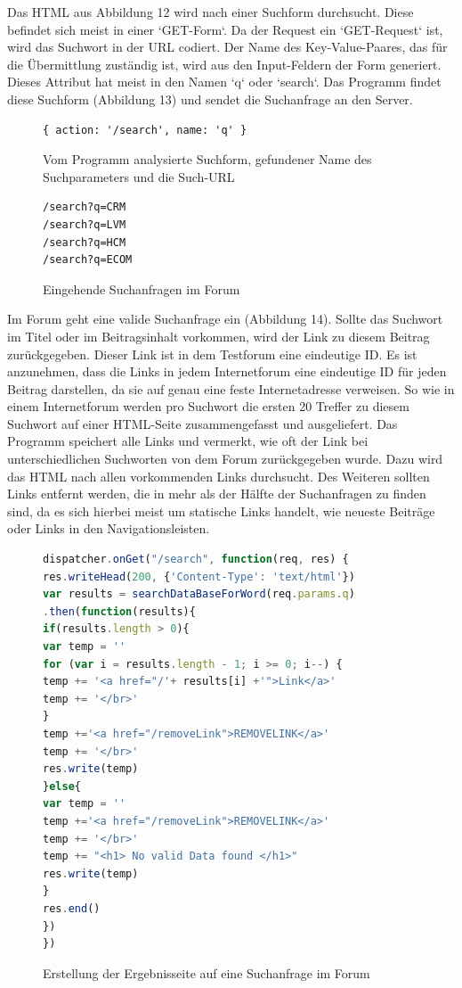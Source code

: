 Das HTML aus Abbildung 12 wird nach einer Suchform durchsucht. Diese befindet sich meist in einer `GET-Form`. Da der Request ein `GET-Request` ist, wird das Suchwort in der URL codiert. Der Name des Key-Value-Paares, das für die Übermittlung zuständig ist, wird aus den Input-Feldern der Form generiert. Dieses Attribut hat meist in den Namen `q` oder `search`. Das Programm findet diese Suchform (Abbildung 13) und sendet die Suchanfrage an den Server.


\begin{figure}[ht]
\begin{lstlisting}[language=HTML5]
{ action: '/search', name: 'q' }
\end{lstlisting}
\caption{Vom Programm analysierte Suchform, gefundener Name des Suchparameters und die Such-URL}
\end{figure}


\begin{figure}[ht]
\begin{lstlisting}[language=HTML5]
/search?q=CRM
/search?q=LVM
/search?q=HCM
/search?q=ECOM
\end{lstlisting}
\caption{Eingehende Suchanfragen im Forum }
\end{figure}
Im Forum geht eine valide Suchanfrage ein (Abbildung 14).
Sollte das Suchwort im Titel oder im Beitragsinhalt vorkommen, wird der Link zu diesem Beitrag zurückgegeben. Dieser Link ist in dem Testforum eine eindeutige ID. Es ist anzunehmen, dass die Links in jedem Internetforum eine eindeutige ID für jeden Beitrag darstellen, da sie auf genau eine feste Internetadresse verweisen. So wie in einem Internetforum werden pro Suchwort die ersten 20 Treffer zu diesem Suchwort auf einer HTML-Seite zusammengefasst und ausgeliefert. Das Programm speichert alle Links und vermerkt, wie oft der Link bei unterschiedlichen Suchworten von dem Forum zurückgegeben wurde. Dazu wird das HTML nach allen vorkommenden Links durchsucht. Des Weiteren sollten Links entfernt werden, die in mehr als der Hälfte der Suchanfragen zu finden sind, da es sich hierbei meist um statische Links handelt, wie neueste Beiträge oder Links in den Navigationsleisten.
\newpage

\begin{figure}[h!]
\begin{lstlisting}[language=JavaScript]
dispatcher.onGet("/search", function(req, res) {
res.writeHead(200, {'Content-Type': 'text/html'})
var results = searchDataBaseForWord(req.params.q)
.then(function(results){
if(results.length > 0){
var temp = ''
for (var i = results.length - 1; i >= 0; i--) {
temp += '<a href="/'+ results[i] +'">Link</a>'
temp += '</br>'
}
temp +='<a href="/removeLink">REMOVELINK</a>'
temp += '</br>'
res.write(temp)
}else{
var temp = ''
temp +='<a href="/removeLink">REMOVELINK</a>'
temp += '</br>'
temp += "<h1> No valid Data found </h1>"
res.write(temp)
}
res.end() 
}) 
})
\end{lstlisting}
\caption{Erstellung der Ergebnisseite auf eine Suchanfrage im Forum}
\end{figure}

